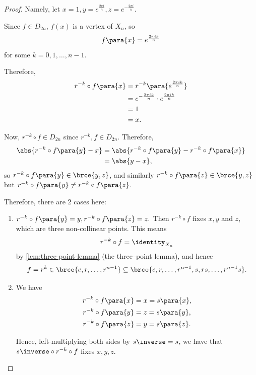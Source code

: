 \begin{proof}
    Namely, let \(x = 1, y = e^{\frac{2 \pi i}{n}}, z = e^{- \frac{2 \pi i}{n}}\).

    Since \(f \in D_{2n}\), \(f(x)\) is a vertex of \(X_n\), so
    \[
        f\para{x} = e^{\frac{2 \pi i k}{n}}
    \]
    for some \(k = 0, 1, \ldots, n - 1\).

    Therefore,
    \begin{align*}
        r^{-k} \circ f \para{x} &= r^{-k} \para{e^{\frac{2 \pi i k}{n}}} \\
        &= e^{- \frac{2 \pi i k}{n}} \cdot e^{\frac{2 \pi i k}{n}} \\
        &= 1 \\
        &= x.
    \end{align*}

    Now, \(r^{-k} \circ f \in D_{2n}\) since \(r^{-k}, f \in D_{2n}\). Therefore,
    \begin{align*}
        \abs{r^{-k} \circ f \para{y} - x} &= \abs{r^{-k} \circ f \para{y} - r^{-k} \circ f \para{x}} \\
        &= \abs{y - x},
    \end{align*}
    so \(r^{-k} \circ f \para{y} \in \brce{y, z}\), and similarly \(r^{-k} \circ f \para{z} \in \brce{y, z}\) but \(r^{-k} \circ f \para{y} \neq r^{-k} \circ f \para{z}\).

    Therefore, there are \(2\) cases here:
    \begin{enumerate}
        \item \(r^{-k} \circ f \para{y} = y, r^{-k} \circ f \para{z} = z.\) Then \(r^{-k} \circ f\) fixes \(x, y\) and \(z\), which are three non-collinear points. This means
        \[
            r^{-k} \circ f = \identity_{X_n}
        \]
        by \autoref{lem:three-point-lemma} (the three--point lemma), and hence
        \[
            f = r^k \in \brce{e, r, \ldots, r^{n - 1}} \subseteq \brce{e, r, \ldots, r^{n - 1}, s, rs, \ldots, r^{n - 1}s}.
        \]

        \item We have
        \begin{align*}
            r^{-k} \circ f \para{x} &= x = s\para{x}, \\
            r^{-k} \circ f \para{y} &= z = s\para{y}, \\
            r^{-k} \circ f \para{z} &= y = s\para{z}.
        \end{align*}

        Hence, left-multiplying both sides by \(s\inverse = s\), we have that \(s\inverse \circ r^{-k} \circ f\) fixes \(x, y, z\).


\end{enumerate}
\end{proof}
